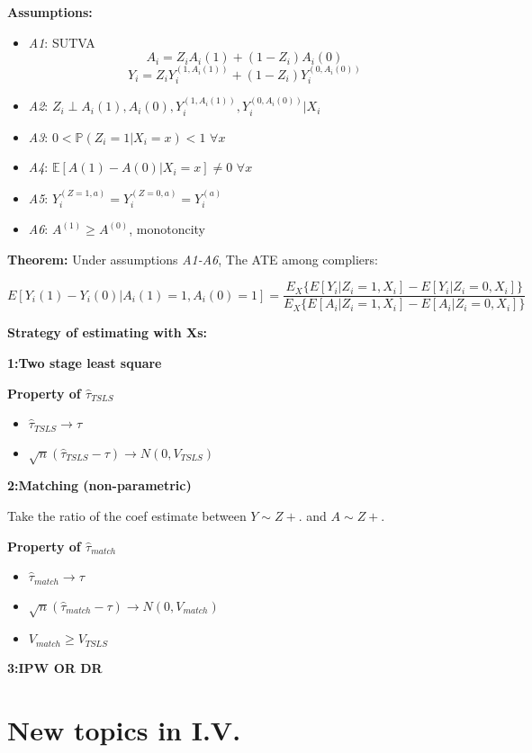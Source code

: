 \documentclass[
]{book}
\providecommand{\tightlist}{%
  \setlength{\itemsep}{0pt}\setlength{\parskip}{0pt}}
\begin{document}
\textbf{Assumptions:}

\begin{itemize}
\tightlist
\item
  \emph{A1}: SUTVA
  \[A_i = Z_iA_i(1) + (1-Z_i)A_i(0)\]
  \[Y_i = Z_iY_i^{(1, A_i(1))} + (1-Z_i)Y_i^{(0, A_i(0))}\]
\item
  \emph{A2}: \(Z_i \perp A_i(1),A_i(0), Y_i^{(1, A_i(1))},Y_i^{(0, A_i(0))} | X_i\)
\item
  \emph{A3}: \(0 < \mathbb{P}(Z_i = 1 |X_i=x) <1\,\,\forall x\)
\item
  \emph{A4}: \(\mathbb{E}[A(1) - A(0)|X_i=x] \neq 0\,\,\forall x\)
\item
  \emph{A5}: \(Y_i^{(Z=1, a)}=Y_i^{(Z=0, a)} = Y_i^{(a)}\)
\item
  \emph{A6}: \(A^{(1)} \geq A^{(0)}\), monotoncity
\end{itemize}

\textbf{Theorem:} Under assumptions \emph{A1-A6}, The ATE among compliers:

\[{E}[Y_i(1) - Y_i(0) | A_i(1)=1, A_i(0)=1]=\frac{E_X\{E[Y_i|Z_i=1,X_i]-E[Y_i|Z_i=0,X_i]\}}{E_X\{E[A_i|Z_i=1,X_i]-E[A_i|Z_i=0,X_i]\}}\]

\textbf{Strategy of estimating with Xs:}

\textbf{1:Two stage least square}

\textbf{Property of \(\hat \tau_{TSLS}\)}

\begin{itemize}
\tightlist
\item
  \(\hat \tau_{TSLS}\to\tau\)
\item
  \(\sqrt{n}(\hat \tau_{TSLS}-\tau) \to N(0, V_{TSLS})\)
\end{itemize}

\textbf{2:Matching (non-parametric)}

Take the ratio of the coef estimate between \(Y\sim Z+.\) and \(A\sim Z+.\)

\textbf{Property of \(\hat \tau_{match}\)}

\begin{itemize}
\tightlist
\item
  \(\hat \tau_{match}\to\tau\)
\item
  \(\sqrt{n}(\hat \tau_{match}-\tau) \to N(0, V_{match})\)
\item
  \(V_{match} \geq V_{TSLS}\)
\end{itemize}

\textbf{3:IPW OR DR}

\hypertarget{new-topics-in-i.v.}{%
\section{New topics in I.V.}\label{new-topics-in-i.v.}}
\end{document}
